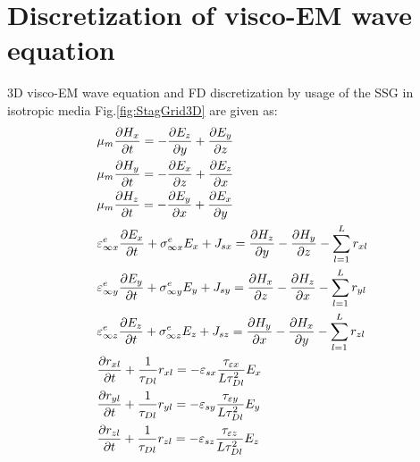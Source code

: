 \documentclass[pdftex,a4paper,parskip,listof=totoc,bibliography=totoc,onehalfspacing,12pt]{scrreprt}
\begin{document}
\section{Discretization of visco-EM wave equation}
3D visco-EM wave equation and FD discretization by usage of the SSG in isotropic media Fig.\ref{fig:StagGrid3D} are given as:
\begin{equation}
\begin{aligned}
  &\mu_{m} \pdv{H_{x}}{t} = -\pdv{E_z}{y} + \pdv{E_y}{z}\\
  &\mu_{m} \pdv{H_{y}}{t} = -\pdv{E_x}{z} + \pdv{E_z}{x}\\
  &\mu_{m} \pdv{H_{z}}{t} = -\pdv{E_y}{x} + \pdv{E_x}{y}\\
  &\varepsilon^e_{\infty x} \pdv{E_{x}}{t} + \sigma^e_{\infty x} E_{x} + J_{sx} = \pdv{H_z}{y} - \pdv{H_y}{z} - \sum_{l=1}^L r_{xl} \\
  &\varepsilon^e_{\infty y} \pdv{E_{y}}{t} + \sigma^e_{\infty y} E_{y} + J_{sy} = \pdv{H_x}{z} - \pdv{H_z}{x} - \sum_{l=1}^L r_{yl} \\
  &\varepsilon^e_{\infty z} \pdv{E_{z}}{t} + \sigma^e_{\infty z} E_{z} + J_{sz} = \pdv{H_y}{x} - \pdv{H_x}{y} - \sum_{l=1}^L r_{zl} \\
  &\pdv{r_{xl}}{t} + \frac{1}{\tau_{Dl} } r_{xl} = -\varepsilon_{s x} \frac{\tau_{\varepsilon x}}{L \tau_{Dl}^2} E_{x}\\
  &\pdv{r_{yl}}{t} + \frac{1}{\tau_{Dl} } r_{yl} = -\varepsilon_{s y} \frac{\tau_{\varepsilon y}}{L \tau_{Dl}^2} E_{y}\\
  &\pdv{r_{zl}}{t} + \frac{1}{\tau_{Dl} } r_{zl} = -\varepsilon_{s z} \frac{\tau_{\varepsilon z}}{L \tau_{Dl}^2} E_{z}
\end{aligned}
\end{equation}
\end{document}
